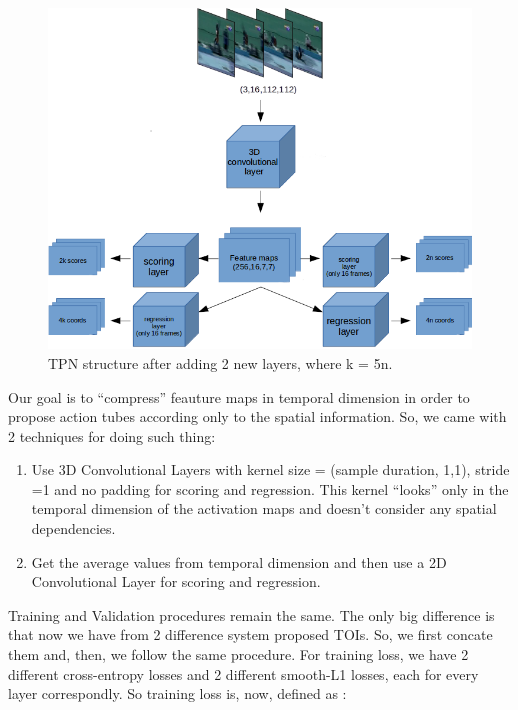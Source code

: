 \documentclass{report}
\begin{document}
\begin{figure}[h]
  \centering
  \includegraphics[scale=0.5]{tpn_1_2}
  \caption{TPN structure after adding 2 new layers, where k = 5n.}
  \label{fig:tpn_1_2}
\end{figure}
Our goal is to ``compress'' feauture maps in temporal dimension in order to propose action tubes  according only to the spatial information.
So, we came with 2 techniques for doing such thing:
\begin{enumerate}
\item Use 3D Convolutional Layers with kernel size = (sample duration, 1,1), stride =1 and no padding for scoring and regression.
  This kernel ``looks'' only in the temporal dimension of the activation maps and doesn't consider any spatial dependencies.
\item Get the average values from temporal dimension and then use a 2D Convolutional Layer for scoring and regression.
\end{enumerate}

\par
Training and Validation procedures remain the same. The only big difference is that now we have from 2 difference system proposed TOIs. So, we first concate
them and, then, we follow the same procedure. For training loss, we have 2 different cross-entropy losses and 2 different smooth-L1 losses, each for every
layer correspondly. So training loss is, now, defined as :

\end{document}

